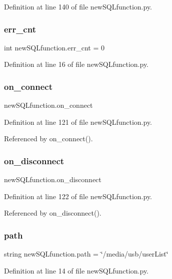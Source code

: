 Definition at line 140 of file new\+S\+Q\+Lfunction.\+py.

\mbox{\label{namespacenew_s_q_lfunction_a5646bbcdcb8af7f59ef07e67be4b5123}} 
\subsubsection{err\+\_\+cnt}
{\footnotesize\ttfamily int new\+S\+Q\+Lfunction.\+err\+\_\+cnt = 0}



Definition at line 16 of file new\+S\+Q\+Lfunction.\+py.

\mbox{\label{namespacenew_s_q_lfunction_a60173f053fd09edda1002eda3129ec1d}} 
\subsubsection{on\+\_\+connect}
{\footnotesize\ttfamily new\+S\+Q\+Lfunction.\+on\+\_\+connect}



Definition at line 121 of file new\+S\+Q\+Lfunction.\+py.



Referenced by on\+\_\+connect().

\mbox{\label{namespacenew_s_q_lfunction_a6348dc01dd526416fe62109dce7a5150}} 
\subsubsection{on\+\_\+disconnect}
{\footnotesize\ttfamily new\+S\+Q\+Lfunction.\+on\+\_\+disconnect}



Definition at line 122 of file new\+S\+Q\+Lfunction.\+py.



Referenced by on\+\_\+disconnect().

\mbox{\label{namespacenew_s_q_lfunction_a4bfb90e062abf64339ef98dfde3658e7}} 
\subsubsection{path}
{\footnotesize\ttfamily string new\+S\+Q\+Lfunction.\+path = \char`\"{}/media/usb/user\+List\char`\"{}}



Definition at line 14 of file new\+S\+Q\+Lfunction.\+py.

